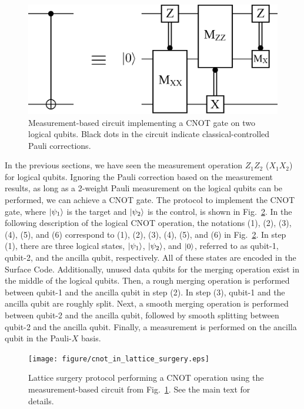 \documentclass[a4paper,11pt]{ltjsarticle}
\begin{document}
{{        \begin{figure}[h]
            \centering
            \includegraphics[scale=0.30]{figure/logical_cnot.eps}
            \vspace{0pt}\caption{Measurement-based circuit implementing a CNOT gate on two logical qubits. Black dots in the circuit indicate classical-controlled Pauli corrections.}
            \label{logical_cnot}
            \vspace{-10pt}
        \end{figure}

        In the previous sections, we have seen the measurement operation $Z_1Z_2$ ($X_1X_2$) for logical qubits. Ignoring the Pauli correction based on the measurement results, as long as a 2-weight Pauli measurement on the logical qubits can be performed, we can achieve a CNOT gate. The protocol to implement the CNOT gate, where $\ket{\psi_1}$ is the target and $\ket{\psi_2}$ is the control, is shown in Fig.~\ref{cnot_in_lattice_surgery}. In the following description of the logical CNOT operation, the notations (1), (2), (3), (4), (5), and (6) correspond to (1), (2), (3), (4), (5), and (6) in Fig.~\ref{cnot_in_lattice_surgery}. In step (1), there are three logical states, $\ket{\psi_1}$, $\ket{\psi_2}$, and $\ket{0}$, referred to as qubit-1, qubit-2, and the ancilla qubit, respectively. All of these states are encoded in the Surface Code. Additionally, unused data qubits for the merging operation exist in the middle of the logical qubits. Then, a rough merging operation is performed between qubit-1 and the ancilla qubit in step (2). In step (3), qubit-1 and the ancilla qubit are roughly split. Next, a smooth merging operation is performed between qubit-2 and the ancilla qubit, followed by smooth splitting between qubit-2 and the ancilla qubit. Finally, a measurement is performed on the ancilla qubit in the Pauli-$X$ basis. 

        \begin{figure}[h]
            \centering
            \texttt{[image: figure/cnot\_in\_lattice\_surgery.eps]}
            \vspace{0pt}\caption{Lattice surgery protocol performing a CNOT operation using the measurement-based circuit from Fig.~\ref{logical_cnot}. See the main text for details.}
            \label{cnot_in_lattice_surgery}
            \vspace{-10pt}
        \end{figure}

    }
}
\end{document}
